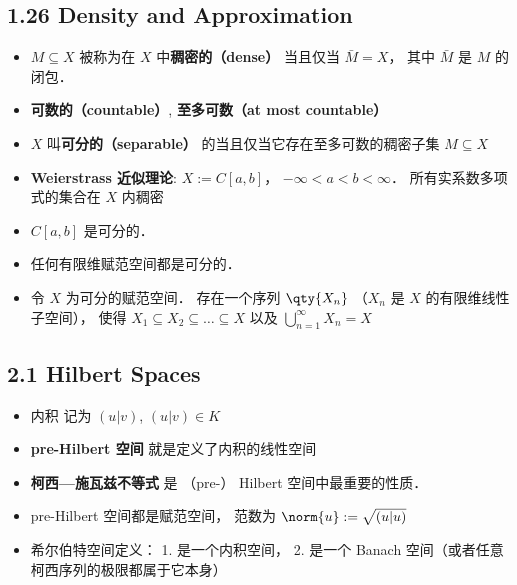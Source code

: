 \subsection{1.26 Density and Approximation}
\begin{itemize}
\item $M \subseteq X$ 被称为在 $X$ 中\textbf{稠密的（dense）} 当且仅当 $\bar M = X$， 其中 $\bar M$ 是 $M$ 的闭包．

\item \textbf{可数的（countable）}, \textbf{至多可数（at most countable）}

\item $X$ 叫\textbf{可分的（separable）} 的当且仅当它存在至多可数的稠密子集 $M \subseteq X$

\item \textbf{Weierstrass 近似理论}: $X := C[a, b]$， $-\infty < a < b < \infty$． 所有实系数多项式的集合在 $X$ 内稠密

\item $C[a, b]$ 是可分的．

\item 任何有限维赋范空间都是可分的．

\item 令 $X$ 为可分的赋范空间． 存在一个序列 $\qty{X_n}$ （$X_n$ 是 $X$ 的有限维线性子空间）， 使得 $X_1 \subseteq X_2 \subseteq \dots \subseteq X$ 以及 $\bigcup_{n=1}^\infty X_n = X$

\end{itemize}

\subsection{2.1 Hilbert Spaces}
\begin{itemize}
\item 内积 记为 $(u|v)$, $(u|v) \in K$

\item \textbf{pre-Hilbert 空间}  就是定义了内积的线性空间

\item \textbf{柯西—施瓦兹不等式} 是 （pre-） Hilbert 空间中最重要的性质．

\item pre-Hilbert 空间都是赋范空间， 范数为 $\norm{u} := \sqrt{(u|u)}$

\item 希尔伯特空间定义： 1. 是一个内积空间， 2. 是一个 Banach 空间（或者任意柯西序列的极限都属于它本身）

\end{itemize}

